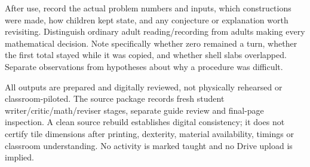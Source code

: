 \documentclass[11pt]{article}
\begin{document}
After use, record the actual problem numbers and inputs, which constructions were made, how children kept state, and any conjecture or explanation worth revisiting. Distinguish ordinary adult reading/recording from adults making every mathematical decision. Note specifically whether zero remained a turn, whether the first total stayed while it was copied, and whether shell slabs overlapped. Separate observations from hypotheses about why a procedure was difficult.

All outputs are prepared and digitally reviewed, not physically rehearsed or classroom-piloted. The source package records fresh student writer/critic/math/reviser stages, separate guide review and final-page inspection. A clean source rebuild establishes digital consistency; it does not certify tile dimensions after printing, dexterity, material availability, timings or classroom understanding. No activity is marked taught and no Drive upload is implied.
\end{document}
